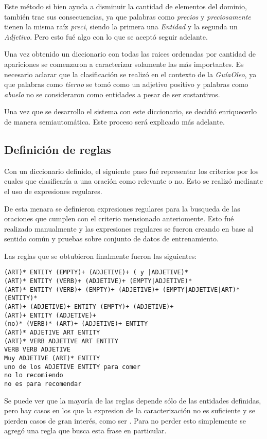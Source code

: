 Este método si bien ayuda a disminuir la cantidad de elementos del dominio, también trae sus consecuencias, ya que palabras como \emph{precios} y \emph{preciosamente} tienen la misma raíz \emph{preci}, siendo la primera una \emph{Entidad} y la segunda un \emph{Adjetivo}. Pero esto fué algo con lo que se aceptó seguir adelante.

Una vez obtenido un diccionario con todas las raices ordenadas por cantidad de apariciones se comenzaron a caracterizar solamente las más importantes. Es necesario aclarar que la clasificación se realizó en el contexto de la \emph{GuíaOleo}, ya que palabras como \emph{tierno} se tomó como un adjetivo positivo y palabras como \emph{abuelo} no se consideraron como entidades a pesar de ser sustantivos.

Una vez que se desarrollo el sistema con este diccionario, se decidió enriquecerlo de manera semiautomática. Este proceso será explicado más adelante.


\subsection{Definición de reglas}

Con un diccionario definido, el siguiente paso fué representar los criterios por los cuales que clasificaría a una oración como relevante o no. Esto se realizó mediante el uso de expresiones regulares.

De esta menara se definieron expresiones regulares para la busqueda de las oraciones que cumplen con el criterio mensionado anteriomente. Esto fué realizado manualmente y las expresiones regulares se fueron creando en base al sentido común y pruebas sobre conjunto de datos de entrenamiento.

Las reglas que se obtubieron finalmente fueron las siguientes:

\begin{verbatim}
(ART)* ENTITY (EMPTY)+ (ADJETIVE)+ ( y |ADJETIVE)*
(ART)* ENTITY (VERB)+ (ADJETIVE)+ (EMPTY|ADJETIVE)*
(ART)* ENTITY (VERB)+ (EMPTY)+ (ADJETIVE)+ (EMPTY|ADJETIVE|ART)* (ENTITY)*
(ART)+ (ADJETIVE)+ ENTITY (EMPTY)+ (ADJETIVE)+
(ART)+ ENTITY (ADJETIVE)+
(no)* (VERB)* (ART)+ (ADJETIVE)+ ENTITY
(ART)* ADJETIVE ART ENTITY
(ART)* VERB ADJETIVE ART ENTITY
VERB VERB ADJETIVE
Muy ADJETIVE (ART)* ENTITY
uno de los ADJETIVE ENTITY para comer
no lo recomiendo
no es para recomendar
\end{verbatim}

Se puede ver que la mayoría de las reglas depende sólo de las entidades definidas, pero hay casos en los que la expresion de la caracterización no es suficiente y se pierden casos de gran interés, como ser . Para no perder esto simplemente se agregó una regla que busca esta frase en particular.


